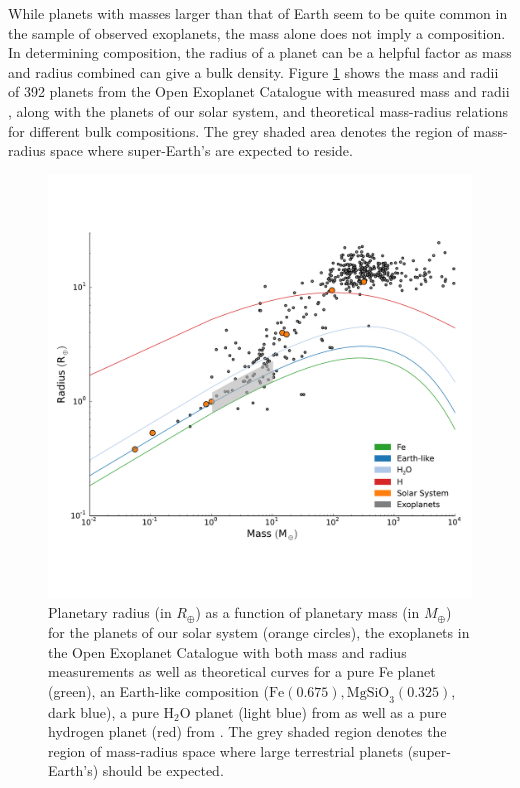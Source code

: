 While planets with masses larger than that of Earth seem to be quite common in the sample of observed exoplanets, the mass alone does not imply a composition. In determining composition, the radius of a planet can be a helpful factor as mass and radius combined can give a bulk density. Figure \ref{fig:exoplanetmassradii} shows the mass and radii of 392 planets from the Open Exoplanet Catalogue with measured mass and radii \citep{rein2015}, along with the planets of our solar system, and theoretical mass-radius relations for different bulk compositions. The grey shaded area denotes the region of mass-radius space where super-Earth's are expected to reside.
\begin{figure}
	\centering
        \includegraphics[width=\textwidth]{Chapter3/Figures/ExoplanetsMassRadius.pdf}
        \caption{Planetary radius (in $R_\oplus$) as a function of planetary mass (in $M_\oplus$) for the planets of our solar system (orange circles), the exoplanets in the Open Exoplanet Catalogue with both mass and radius measurements \citep{rein2015} as well as theoretical curves for a pure Fe planet (green), an Earth-like composition ($\textrm{Fe}\left(0.675\right), \textrm{MgSiO}_3(0.325)$, dark blue), a pure $\textrm{H}_{2}\textrm{O}$ planet (light blue) from \citet{seager2007} as well as a pure hydrogen planet (red) from  \citet{zapolsky1969}. The grey shaded region denotes the region of mass-radius space where large terrestrial planets (super-Earth's) should be expected. }
        \label{fig:exoplanetmassradii}
\end{figure}

